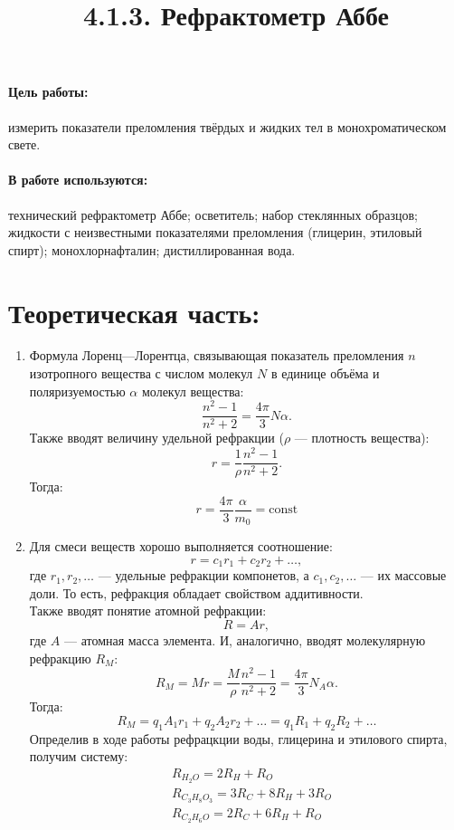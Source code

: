 \documentclass[12pt]{article}
\title{4.1.3. Рефрактометр Аббе}
\date{}
\begin{document}
\maketitle

\paragraph{Цель работы:}измерить показатели преломления твёрдых и жидких тел в монохроматическом свете.

\paragraph{В работе используются:}технический рефрактометр Аббе; осветитель; набор стеклянных образцов; жидкости с неизвестными показателями преломления (глицерин, этиловый спирт); монохлорнафталин; дистиллированная вода.

\section*{Теоретическая часть:}
\begin{enumerate}
    \item Формула Лоренц—Лорентца, связывающая показатель преломления $n$ изотропного вещества с числом молекул $N$ в единице объёма и поляризуемостью $\alpha$ молекул вещества:
    \begin{equation}\label{eq:1}
        \frac{n^2 - 1}{n^2 + 2} = \frac{4\pi}{3}N\alpha.
    \end{equation}
    Также вводят величину удельной рефракции ($\rho$ --- плотность вещества):
    \[ r = \frac{1}{\rho} \frac{n^2 - 1}{n^2 + 2}. \]
    Тогда:
    \[ r = \frac{4\pi}{3} \frac{\alpha}{m_0} = \mathrm{const} \]
    
    \item Для смеси веществ хорошо выполняется соотношение:
    \[ r = c_1 r_1 + c_2 r_2 + \dots, \]
    где $r_1, r_2, \dots $ --- удельные рефракции компонетов, а $ c_1, c_2,\dots $ --- их массовые доли. То есть, рефракция обладает свойством аддитивности. \\
    Также вводят понятие атомной рефракции:
    \[ R = A r,\]
    где $A$ --- атомная масса элемента. И, аналогично, вводят молекулярную рефракцию $R_M$:
    \[ R_M = M r = \frac{M}{\rho} \frac{n^2 - 1}{n^2 + 2} = \frac{4\pi}{3}N_A \alpha. \]
    Тогда:
    \[ R_M = q_1 A_1 r_1 + q_2 A_2 r_2 + \dots = q_1 R_1 + q_2 R_2 + \dots \]
    Определив в ходе работы рефрацкции воды, глицерина и этилового спирта, получим систему:
    \begin{align*}
        &R_{H_2 O} = 2R_H +R_O                   \\
        &R_{C_3 H_8 O_3} = 3R_C + 8R_H + 3R_O    \\
        &R_{C_2 H_6 O} = 2R_C + 6R_H + R_O
    \end{align*}
\end{enumerate}
\newpage
    
\end{document}
